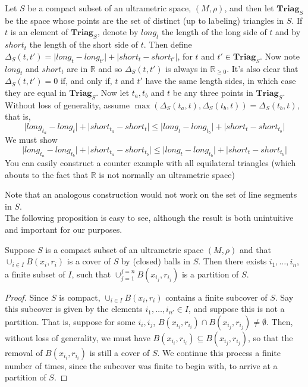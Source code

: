 \begin{example}
Let $S$ be a compact subset of an ultrametric space, $(M,\rho)$, and then let $\textbf{Triag}_S$ be the space whose points are the set of distinct (up to labeling) triangles in $S$. If $t$ is an element of $\textbf{Triag}_S$, denote by $long_t$ the length of the long side of $t$ and by $short_t$  the length of the short side of $t$. Then define $\Delta_S(t,t') = \lvert long_t - long_{t'}\rvert + \lvert short_t - short_{t'} \rvert$, for $t$ and $t' \in \textbf{Triag}_S$. Now note $long_t$ and $short_t$ are in $\mathbb{R}$ and so $\Delta_S(t,t')$ is always in $\mathbb{R}_{\geq 0}$. It's also clear that $\Delta_S(t,t') = 0$ if, and only if, $t$ and $t'$ have the same length sides, in which case they are equal in $\textbf{Triag}_S$. Now let $t_a, t_b$ and $t$ be any three points in $\textbf{Triag}_S$. Without loss of generality, assume $\max(\Delta_S(t_a,t), \Delta_S(t_b,t))=\Delta_S(t_b,t)$, that is,
\[ \lvert long_{t_a} - long_{t}\rvert + \lvert short_{t_a} - short_{t} \rvert \leq \lvert long_{t} - long_{t_b}\rvert + \lvert short_{t} - short_{t_b} \rvert \]
We must show
\[\lvert long_{t_a} - long_{t_b}\rvert + \lvert short_{t_a} - short_{t_b} \rvert \leq \lvert long_{t} - long_{t_b}\rvert + \lvert short_{t} - short_{t_b} \rvert\]
You can easily construct a counter example with all equilateral triangles (which abouts to the fact that $\mathbb{R}$ is not normally an ultrametric space)
\end{example}
Note that an analogous construction would not work on the set of line segments in $S$.\\

The following proposition is  easy to see, although the result is both unintuitive and important for our purposes. \\

\begin{proposition}
Suppose $S$ is a compact subset of an ultrametric space $(M, \rho)$ and that $\cup_{i \in I} B(x_i,r_i)$ is a cover of $S$ by (closed) balls in $S$. Then there exists $i_1,\ldots, i_n$, a finite subset of $I$, such that  $\cup_{j=1}^{j=n} B(x_{i_j},r_{i_j})$ is a partition of $S$.
\end{proposition}

\begin{proof}
Since $S$ is compact, $\cup_{i \in I} B(x_i,r_i)$ contains a finite subcover of $S$. Say this subcover is given by the elements  $i_1,\ldots, i_{n'} \in I$, and suppose this is not a partition. That is, suppose for some $i_i, i_j$, $ B(x_{i_i},r_{i_i}) \cap  B(x_{i_j},r_{i_j}) \neq \emptyset$. Then, without loss of generality, we must have $ B(x_{i_i},r_{i_i}) \subseteq  B(x_{i_j},r_{i_j})$, so that the removal of $ B(x_{i_i},r_{i_i})$ is still a cover of $S$. We continue this process a finite number of times, since the subcover was finite to begin with, to arrive at a partition of $S$.
\end{proof}

